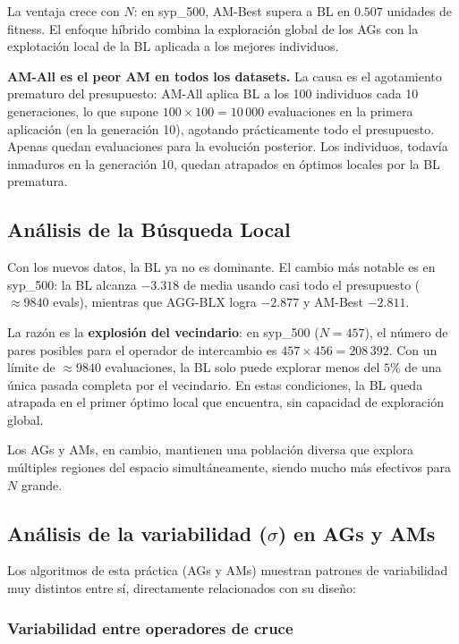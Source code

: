 \documentclass[12pt,a4paper]{article}
\begin{document}
La ventaja crece con $N$: en syp\_500, AM-Best supera a BL en $0.507$ unidades de
fitness. El enfoque híbrido combina la exploración global de los AGs con la explotación
local de la BL aplicada a los mejores individuos.

\textbf{AM-All es el peor AM en todos los datasets.} La causa es el agotamiento
prematuro del presupuesto: AM-All aplica BL a los 100 individuos cada 10 generaciones,
lo que supone $100 \times 100 = 10\,000$ evaluaciones en la primera aplicación (en la
generación 10), agotando prácticamente todo el presupuesto. Apenas quedan evaluaciones
para la evolución posterior. Los individuos, todavía inmaduros en la generación 10,
quedan atrapados en óptimos locales por la BL prematura.

\subsection{Análisis de la Búsqueda Local}

Con los nuevos datos, la BL ya no es dominante. El cambio más notable es en syp\_500:
la BL alcanza $-3.318$ de media usando casi todo el presupuesto ($\approx 9840$ evals),
mientras que AGG-BLX logra $-2.877$ y AM-Best $-2.811$.

La razón es la \textbf{explosión del vecindario}: en syp\_500 ($N=457$), el número de
pares posibles para el operador de intercambio es $457 \times 456 = 208\,392$. Con un
límite de $\approx 9840$ evaluaciones, la BL solo puede explorar menos del $5\%$ de una
única pasada completa por el vecindario. En estas condiciones, la BL queda atrapada en
el primer óptimo local que encuentra, sin capacidad de exploración global.

Los AGs y AMs, en cambio, mantienen una población diversa que explora múltiples regiones
del espacio simultáneamente, siendo mucho más efectivos para $N$ grande.

\subsection{Análisis de la variabilidad ($\sigma$) en AGs y AMs}

Los algoritmos de esta práctica (AGs y AMs) muestran patrones de variabilidad
muy distintos entre sí, directamente relacionados con su diseño:

\subsubsection*{Variabilidad entre operadores de cruce}
\end{document}

